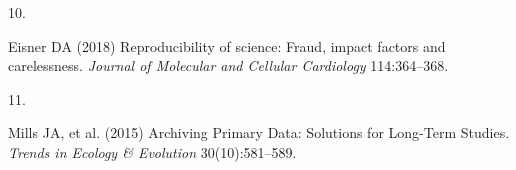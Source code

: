 \documentclass[9pt,twocolumn,twoside,]{pnas-new}
\newlength{\cslhangindent}
\newlength{\csllabelwidth}
\newlength{\cslentryspacingunit} %
\newenvironment{CSLReferences}[2] %
 {%
  \setlength{\parindent}{0pt}
  \ifodd #1
  \let\oldpar\par
  \def\par{\hangindent=\cslhangindent\oldpar}
  \fi
  \setlength{\parskip}{#2\cslentryspacingunit}
 }%
 {}
\newcommand{\CSLLeftMargin}[1]{\parbox[t]{\csllabelwidth}{#1}}
\newcommand{\CSLRightInline}[1]{\parbox[t]{\linewidth - \csllabelwidth}{#1}\break}
\begin{document}
\begin{CSLReferences}{0}{0}
\leavevmode{}%
\CSLLeftMargin{10. }
\CSLRightInline{Eisner DA (2018) Reproducibility of science: {Fraud},
impact factors and carelessness. \emph{Journal of Molecular and Cellular
Cardiology} 114:364--368.}

\leavevmode{}%
\CSLLeftMargin{11. }
\CSLRightInline{Mills JA, et al. (2015) Archiving {Primary} {Data}:
{Solutions} for {Long}-{Term} {Studies}. \emph{Trends in Ecology \&
Evolution} 30(10):581--589.}

\end{CSLReferences}



% 
\end{document}
